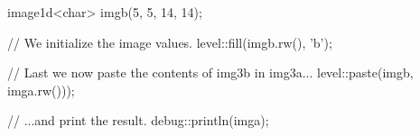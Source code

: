 image1d<char> imgb(5, 5, 14, 14);

// We initialize the image values.
level::fill(imgb.rw(), 'b');

// Last we now paste the contents of img3b in img3a...
level::paste(imgb, imga.rw()));

// ...and print the result.
debug::println(imga);
